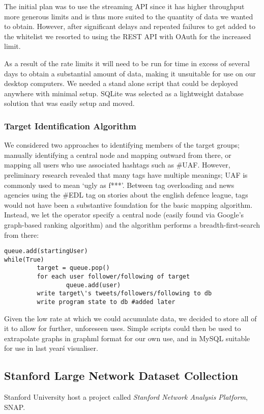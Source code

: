 The initial plan was to use the streaming API since it has higher throughput more generous limits and is thus more suited to the quantity of data we wanted to obtain. However, after significant delays and repeated failures to get added to the whitelist we resorted to using the REST API with OAuth for the increased limit.

As a result of the rate limits it will need to be run for time in excess of several days to obtain a substantial amount of data, making it unsuitable for use on our desktop computers. We needed a stand alone script that could be deployed anywhere with minimal setup. SQLite was selected as a lightweight database solution that was easily setup and moved.

\subsubsection{Target Identification Algorithm}
We considered two approaches to identifying members of the target groups; manually identifying a central node and mapping outward from there, or mapping all users who use associated hashtags such as \#UAF. However, preliminary research revealed that many tags have multiple meanings; UAF is commonly used to mean `ugly as f***'. Between tag overloading and news agencies using the \#EDL tag on stories about the english defence league, tags would not have been a substantive foundation for the basic mapping algorithm. Instead, we let the operator specify a central node (easily found via Google's graph-based ranking algorithm) and the algorithm performs a breadth-first-search from there:

\begin{verbatim}
queue.add(startingUser)
while(True)
         target = queue.pop()
         for each user follower/following of target
                 queue.add(user)
         write target\'s tweets/followers/following to db
         write program state to db #added later
\end{verbatim}

Given the low rate at which we could accumulate data, we decided to store all of it to allow for further, unforeseen uses. Simple scripts could then be used to extrapolate graphs in graphml format for our own use, and in MySQL suitable for use in last year\'s visualiser.

\subsection{Stanford Large Network Dataset Collection}
\label{sec:des_snap}
Stanford University host a project called \emph{Stanford Network Analysis Platform}, SNAP.

